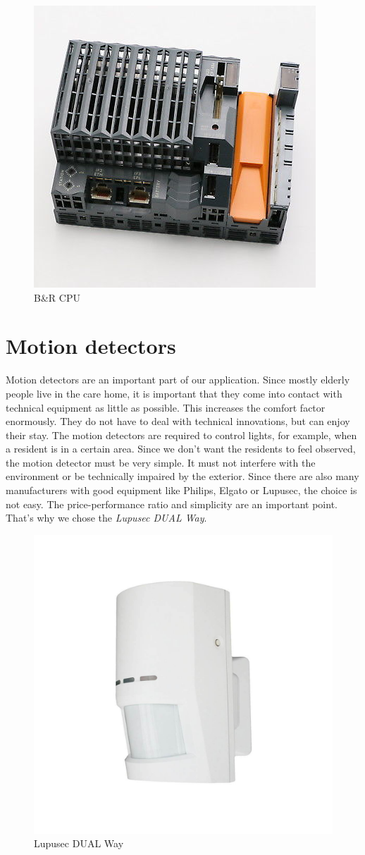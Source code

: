 \begin{figure}[h]
	\centering
	\includegraphics[width=.5\textwidth]{images/CostAnalysis/BR-Automation-X20-CP-1484} 
	\caption{B\&R CPU}
	\label{fig:brCPU}
\end{figure}

\section{Motion detectors}
Motion detectors are an important part of our application. Since mostly elderly people live in the care home, it is important that they come into contact with technical equipment as little as possible. This increases the comfort factor enormously. They do not have to deal with technical innovations, but can enjoy their stay. The motion detectors are required to control lights, for example, when a resident is in a certain area. Since we don't want the residents to feel observed, the motion detector must be very simple. It must not interfere with the environment or be technically impaired by the exterior. Since there are also many manufacturers with good equipment like Philips, Elgato or Lupusec, the choice is not easy. The price-performance ratio and simplicity are an important point. That's why we chose the \textit{Lupusec DUAL Way}.
\newpage
\begin{figure}[h]
	\centering
	\includegraphics[width=.4\textwidth, trim=3cm 3cm 3cm 4cm, clip]{images/CostAnalysis/lupusecBewegungsmelder} 
	\caption{Lupusec DUAL Way}
	\label{fig:lupusecDual}
\end{figure}

